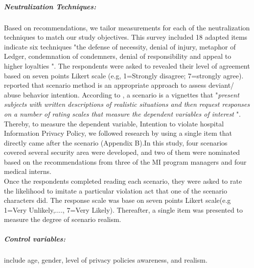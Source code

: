 \subparagraph{Neutralization Techniques:} Based on \cite{Siponen2010} recommendations, we tailor measurements for each of the neutralization techniques to match our study objectives. This survey included 18 adapted items indicate six techniques "the defense of necessity, denial of injury, metaphor of Ledger, condemnation of condemners, denial of responsibility and appeal to higher loyalties ". The respondents were asked to revealed their level of agreement based on seven points Likert scale (e.g, 1=Strongly disagree; 7=strongly agree). \\
\cite{Siponen2010} reported that scenario method is an appropriate approach to assess deviant/ abuse behavior intention. According to \citet{trevino1992experimental} , a scenario is a vignettes that "\textit{present subjects with written descriptions of realistic situations and then request responses on a number of rating scales that measure the dependent variables of interest} ". Thereby, to measure the dependent variable, Intention to violate hospital Information Privacy Policy, we followed \cite{Siponen2010,Teh2015} research by using a single item that  directly came after the scenario (Appendix B).In this study, four scenarios covered several security area were developed, and two of them were nominated based on the recommendations from three of the MI program managers and four medical interns.\\
Once the respondents completed reading each scenario, they were asked to rate the likelihood to imitate a particular violation act that one of the scenario characters did. The response scale was base on seven points Likert scale(e.g 1=Very Unlikely,...., 7=Very Likely). Thereafter, a single item was presented to measure the degree of scenario realism. 
\subparagraph {Control variables: } include age, gender, level of privacy policies awareness, and realism.
 

